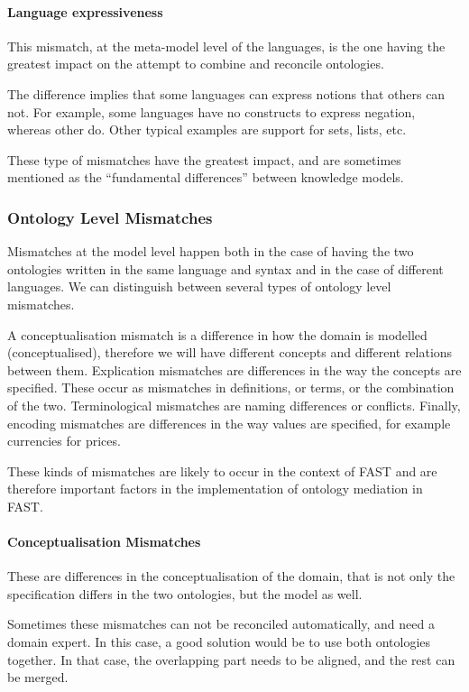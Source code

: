 \paragraph{Language expressiveness}
This mismatch, at the meta-model level of the languages, is the one
having the greatest impact on the attempt to combine and reconcile
ontologies. 

The difference implies that some languages can express notions that
others can not. For example, some languages have no constructs to
express negation, whereas other do. Other typical examples are support
for sets, lists, etc. 

These type of mismatches have the greatest impact, and are sometimes
mentioned as the {\textquotedblleft}fundamental
differences{\textquotedblright} between knowledge models. 

\subsubsection{Ontology Level Mismatches}
\label{subsec:ontologymismatches_ontologylevel}
Mismatches at the model level happen both in the case of having the two
ontologies written in the same language and syntax and in the case of
different languages. We can distinguish between several types of
ontology level mismatches. 

A conceptualisation mismatch is a difference in how the domain is
modelled (conceptualised), therefore we will have different concepts and
different relations between them. Explication mismatches are
differences in the way the concepts are specified. These occur as
mismatches in definitions, or terms, or the combination of the two.
Terminological mismatches are naming differences or conflicts. Finally,
encoding mismatches are differences in the way values are specified,
for example currencies for prices. 

These kinds of mismatches are likely to occur in the context of FAST and
are therefore important factors in the implementation of ontology
mediation in FAST. 

\paragraph{Conceptualisation Mismatches}
These are differences in the conceptualisation of the domain, that is
not only the specification differs in the two ontologies, but the model
as well. 

Sometimes these mismatches can not be reconciled automatically, and need
a domain expert. In this case, a good solution would be to use both
ontologies together. In that case, the overlapping part needs to be
aligned, and the rest can be merged. 

